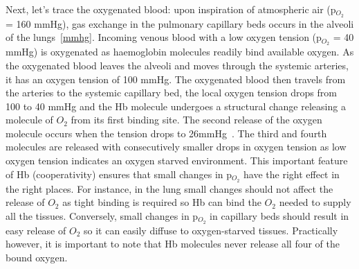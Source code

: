 	Next, let's trace the oxygenated blood: upon inspiration of atmospheric air (p$_{O_2}$ = 160 mmHg), gas exchange in the pulmonary capillary beds occurs in the alveoli of the lungs~\ref{mmhg}.
Incoming venous blood with a low oxygen tension (p$_{O_2}$ = 40 mmHg) is oxygenated as haemoglobin molecules readily bind available oxygen. 
As the oxygenated blood leaves the alveoli and moves through the systemic arteries, it has an oxygen tension of 100 mmHg. 
The oxygenated blood then travels from the arteries to the systemic capillary bed, the local oxygen tension drops from 100 to 40 mmHg and the Hb molecule undergoes a structural change releasing a molecule of ${O_2}$ from its first binding site.  
The second release of the oxygen molecule occurs when the tension drops to 26mmHg~\cite{GomezCambronero:2001hu}. 
The third and fourth molecules are released with consecutively smaller drops in oxygen tension as low oxygen tension indicates an oxygen starved environment. This important feature of Hb (cooperativity) ensures that small changes in p$_{O_2}$ have the right effect in the right places. 
For instance, in the lung small changes should not affect the release of ${O_2}$ as tight binding is required so Hb can bind the ${O_2}$ needed to supply all the tissues. 
Conversely, small changes in p$_{O_2}$ in capillary beds should result in easy release of ${O_2}$ so it can easily diffuse to oxygen-starved tissues. 
Practically however, it is important to note that Hb molecules never release all four of the bound oxygen.

